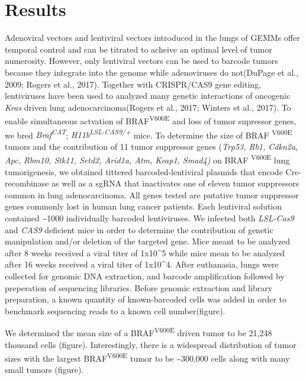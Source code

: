 \hypertarget{results}{%
\section{Results}\label{results}}

Adenoviral vectors and lentiviral vectors introduced in the lungs of GEMMs offer temporal control and can be titrated to acheive an optimal level of tumor numerosity.
However, only lentiviral vectors can be used to barcode tumors because they integrate into the genome while adenoviruses do not(DuPage et al., 2009; Rogers et al., 2017).
Together with CRISPR/CAS9 gene editing, lentiviruses have been used to analyzed many genetic interactions of oncogenic \emph{Kras} driven lung adenocarcinoma(Rogers et al., 2017; Winters et al., 2017).
To enable simultaneous actvation of BRAF\textsuperscript{V600E} and loss of tumor supressor genes, we bred \emph{Braf\textsuperscript{CAT}}; \emph{H11b\textsuperscript{LSL-CAS9/+}} mice.
To determine the size of BRAF \textsuperscript{V600E} tumors and the contribution of 11 tumor suppressor genes (\emph{Trp53, Rb1, Cdkn2a, Apc, Rbm10, Stk11, Setd2, Arid1a, Atm, Keap1, Smad4)} on BRAF \textsuperscript{V600E} lung tumorigenesis, we obtained tittered barcoded-lentiviral plasmids that encode Cre-recombinase as well as a sgRNA that inactivates one of eleven tumor suppressors common in lung adenocarcinoma.
All genes tested are putative tumor suppressor genes commonly lost in human lung cancer patients. Each lentiviral solution contained \textasciitilde1000 individually barcoded lentiviruses.
We infected both \emph{LSL-Cas9} and \emph{CAS9} deficient mice in order to determine the contribution of genetic manipulation and/or deletion of the targeted gene.
Mice meant to be analyzed after 8 weeks received a viral titer of 1x10\^{}5 while mice mean to be analyzed after 16 weeks received a viral titer of 1x10\^{}4. After euthanasia, lungs were collected for genomic DNA extraction, and barcode amplification followed by preperation of sequencing libraries.
Before genomic extraction and library preparation, a known quantity of known-barcoded cells was added in order to benchmark sequencing reads to a known cell number(figure).

We determined the mean size of a BRAF\textsuperscript{V600E} driven tumor to be 21,248 thousand cells (figure).
Interestingly, there is a widespread distribution of tumor sizes with the largest BRAF\textsuperscript{V600E} tumor to be \textasciitilde300,000 cells along with many small tumors (figure).


